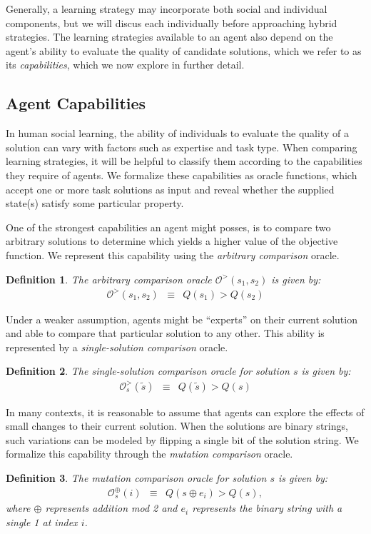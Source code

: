 \documentclass[twocolumn,10pt]{article}
\newtheorem{definition}{Definition}
\begin{document}
Generally, a learning strategy may incorporate both social and individual components, but we will discus each individually before approaching hybrid strategies. The learning strategies available to an agent also depend on the agent's ability to evaluate the quality of candidate solutions, which we refer to as its {\em capabilities}, which we now explore in further detail.


\subsection{Agent Capabilities}
\label{sec:capability}
In human social learning, the ability of individuals to evaluate the quality of a solution can vary with factors such as expertise and task type. When comparing learning strategies, it will be helpful to classify them according to the capabilities they require of agents. We formalize these capabilities as oracle functions, which accept one or more task solutions as input and reveal whether the supplied state(s) satisfy some particular property.

One of the strongest capabilities an agent might posses, is to compare two arbitrary solutions to determine which yields a higher value of the objective function. We represent this capability using the {\em arbitrary comparison} oracle.
\begin{definition}
The arbitrary comparison oracle $\mathcal{O^>}(s_1, s_2)$ is given by:
\begin{eqnarray}
\mathcal{O}^>(s_1, s_2) &\equiv&
Q(s_1) > Q(s_2)
\end{eqnarray}
\end{definition}

Under a weaker assumption, agents might be ``experts'' on their current solution and able to compare that particular solution to any other. This ability is represented by a {\em single-solution comparison} oracle.
\begin{definition}
The single-solution comparison oracle for solution $s$ is given by:
\begin{eqnarray}
\mathcal{O}^>_s(\tilde{s}) &\equiv&
Q(\tilde{s}) > Q(s)
\end{eqnarray}
\end{definition}

In many contexts, it is reasonable to assume that agents can explore the effects of small changes to their current solution. When the solutions are binary strings, such variations can be modeled by flipping a single bit of the solution string. We formalize this capability through the {\em mutation comparison} oracle.
\begin{definition}
The mutation comparison oracle for solution $s$ is given by:
\begin{eqnarray}
\mathcal{O}^\oplus_s(i) &\equiv&
Q(s \oplus e_i) > Q(s),
\end{eqnarray}
where $\oplus$ represents addition mod 2 and $e_i$ represents the binary string with a single 1 at index $i$.
\end{definition}
\end{document}
